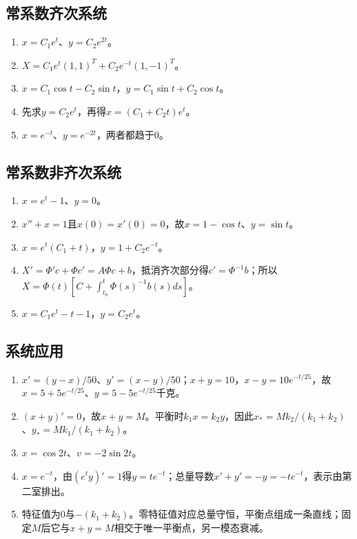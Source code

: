 \documentclass[11pt,a4paper,fontset=fandol]{ctexrep}
\begin{document}
\subsection{常系数齐次系统}
\begin{enumerate}
\item $x=C_1e^t$、$y=C_2e^{2t}$。
\item $X=C_1e^t(1,1)^T+C_2e^{-t}(1,-1)^T$。
\item $x=C_1\cos t-C_2\sin t$，$y=C_1\sin t+C_2\cos t$。
\item 先求$y=C_2e^t$，再得$x=(C_1+C_2t)e^t$。
\item $x=e^{-t}$、$y=e^{-2t}$，两者都趋于0。
\end{enumerate}
\subsection{常系数非齐次系统}
\begin{enumerate}
\item $x=e^t-1$、$y=0$。
\item $x''+x=1$且$x(0)=x'(0)=0$，故$x=1-\cos t$、$y=\sin t$。
\item $x=e^t(C_1+t)$，$y=1+C_2e^{-t}$。
\item $X'=\Phi'c+\Phi c'=A\Phi c+b$，抵消齐次部分得$c'=\Phi^{-1}b$；所以$X=\Phi(t)[C+\int_{t_0}^t\Phi(s)^{-1}b(s)ds]$。
\item $x=C_1e^t-t-1$，$y=C_2e^t$。
\end{enumerate}
\subsection{系统应用}
\begin{enumerate}
\item $x'=(y-x)/50$、$y'=(x-y)/50$；$x+y=10$，$x-y=10e^{-t/25}$，故$x=5+5e^{-t/25}$、$y=5-5e^{-t/25}$千克。
\item $(x+y)'=0$，故$x+y=M$。平衡时$k_1x=k_2y$，因此$x_*=Mk_2/(k_1+k_2)$、$y_*=Mk_1/(k_1+k_2)$。
\item $x=\cos2t$、$v=-2\sin2t$。
\item $x=e^{-t}$，由$(e^ty)'=1$得$y=te^{-t}$；总量导数$x'+y'=-y=-te^{-t}$，表示由第二室排出。
\item 特征值为0与$-(k_1+k_2)$。零特征值对应总量守恒，平衡点组成一条直线；固定$M$后它与$x+y=M$相交于唯一平衡点，另一模态衰减。
\end{enumerate}
\end{document}
